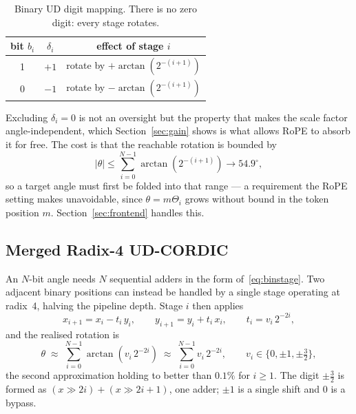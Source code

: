 \begin{table}[h]
\centering
\caption{Binary UD digit mapping. There is no zero digit: every stage rotates.}
\label{tab:bitmap}
\begin{tabular}{ccc}
\toprule
bit $b_i$ & $\delta_i$ & effect of stage $i$ \\
\midrule
1 & $+1$ & rotate by $+\arctan(2^{-(i+1)})$ \\
0 & $-1$ & rotate by $-\arctan(2^{-(i+1)})$ \\
\bottomrule
\end{tabular}
\end{table}

Excluding $\delta_i = 0$ is not an oversight but the property that makes the
scale factor angle-independent, which Section~\ref{sec:gain} shows is what
allows RoPE to absorb it for free. The cost is that the reachable rotation is
bounded by
\begin{equation}
  |\theta| \le \sum_{i=0}^{N-1}\arctan(2^{-(i+1)}) \to 54.9^{\circ},
  \label{eq:binrange}
\end{equation}
so a target angle must first be folded into that range --- a requirement the
RoPE setting makes unavoidable, since $\theta = m\Theta_i$ grows without bound
in the token position $m$. Section~\ref{sec:frontend} handles this.

\subsection{Merged Radix-4 UD-CORDIC}
\label{sec:merged}

An $N$-bit angle needs $N$ sequential adders in the form
of~\eqref{eq:binstage}. Two adjacent binary positions can instead be handled by
a single stage operating at radix~4, halving the pipeline depth. Stage $i$ then
applies
\begin{equation}
  x_{i+1} = x_i - t_i\,y_i, \qquad y_{i+1} = y_i + t_i\,x_i,
  \qquad t_i = v_i\,2^{-2i},
  \label{eq:mergedstage}
\end{equation}
and the realised rotation is
\begin{equation}
  \theta \;\approx\; \sum_{i=0}^{N-1} \arctan\!\left(v_i\,2^{-2i}\right)
  \;\approx\; \sum_{i=0}^{N-1} v_i\,2^{-2i},
  \qquad v_i \in \{0, \pm 1, \pm \tfrac{3}{2}\},
  \label{eq:merged}
\end{equation}
the second approximation holding to better than $0.1\%$ for $i \ge 1$. The
digit $\pm\tfrac{3}{2}$ is formed as $(x \gg 2i) + (x \gg 2i{+}1)$, one adder;
$\pm 1$ is a single shift and $0$ is a bypass.


